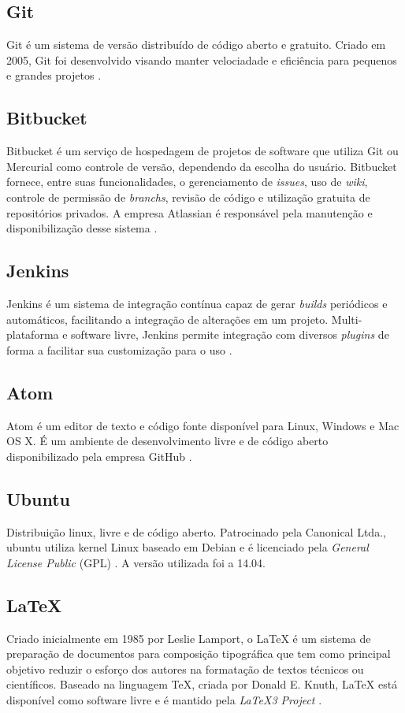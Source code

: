 \subsection{Git}
Git é um sistema de versão distribuído de código aberto e gratuito. Criado em 2005, Git foi desenvolvido visando manter velociadade e eficiência para pequenos e grandes projetos \cite{git}. 

\subsection{Bitbucket}
Bitbucket é um serviço de hospedagem de projetos de software que utiliza Git ou Mercurial como controle de versão, dependendo da escolha do usuário. Bitbucket fornece, entre suas funcionalidades, o gerenciamento de \textit{issues}, uso de \textit{wiki}, controle de permissão de \textit{branchs}, revisão de código e utilização gratuita de repositórios privados. A empresa Atlassian é responsável pela manutenção e disponibilização desse sistema \cite{bitbucket}.

\subsection{Jenkins}
Jenkins é um sistema de integração contínua capaz de gerar \textit{builds} periódicos e automáticos, facilitando a integração de alterações em um projeto. Multi-plataforma e software livre, Jenkins permite integração com diversos \textit{plugins} de forma a facilitar sua customização para o uso \cite{jenkins}.

\subsection{Atom}
Atom é um editor de texto e código fonte disponível para Linux, Windows e Mac OS X. É um ambiente de desenvolvimento livre e de código aberto disponibilizado pela empresa GitHub \cite{atom}. 

\subsection{Ubuntu}
Distribuição linux, livre e de código aberto. Patrocinado pela Canonical Ltda., ubuntu utiliza kernel Linux baseado em Debian e é licenciado pela \textit{General License Public} (GPL) \cite{ubuntu}. A versão utilizada foi a 14.04.  

\subsection{LaTeX}
Criado inicialmente em 1985 por Leslie Lamport, o LaTeX é um sistema de preparação de documentos para composição tipográfica que tem como principal objetivo reduzir o esforço dos autores na formatação de textos técnicos ou científicos. Baseado na linguagem TeX, criada por Donald E. Knuth, LaTeX está disponível como software livre e é mantido pela \textit{LaTeX3 Project} \cite{latex}.

